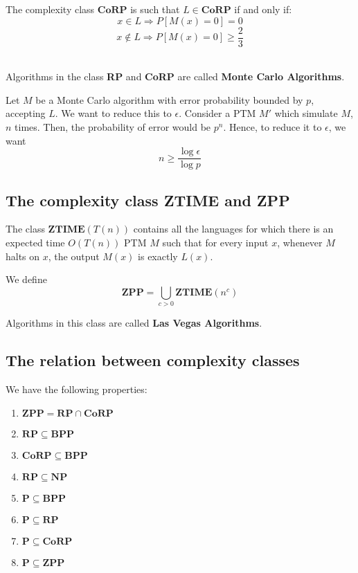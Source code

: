 \documentclass[12pt,letterpaper]{article}
\theoremstyle{definition}
\begin{document}
The complexity class $\mathbf{CoRP}$ is such that $L \in \mathbf{CoRP}$ if and only if:
\[x \in L \Rightarrow P[M(x) = 0] = 0\]
\[x \notin L \Rightarrow P[M(x) = 0] \geq \frac{2}{3}\]\

Algorithms in the class \textbf{RP} and \textbf{CoRP}   are called \textbf{Monte Carlo Algorithms}.

Let $M$ be a Monte Carlo algorithm with error probability bounded by $p$, accepting $L$. We want to reduce this to $\epsilon$. Consider a PTM $M'$  which simulate $M$, $n$  times. Then, the probability of error would be $p^n$. Hence, to reduce it to $\epsilon$, we want
\[n \geq \frac{\log \epsilon}{\log p}\]

\subsection{The complexity class ZTIME and ZPP}

The class $\mathbf{ZTIME}(T(n))$ contains all the languages for which there is an expected time $O(T(n))$ PTM $M$ such that for every input $x$, whenever $M$ halts on $x$, the output $M(x)$ is exactly $L(x)$.

We define 
\[\mathbf{ZPP} = \bigcup_{c > 0} \mathbf{ZTIME}(n^c)\]

Algorithms in this class are called \textbf{Las Vegas Algorithms}.

\subsection{The relation between complexity classes}

We have the following properties:

\begin{enumerate}
  \item $\mathbf{ZPP} = \mathbf{RP} \cap \mathbf{CoRP}$
  \item $\mathbf{RP} \subseteq \mathbf{BPP}$
  \item $\mathbf{CoRP} \subseteq \mathbf{BPP}$
  \item $\mathbf{RP} \subseteq \mathbf{NP}$
  \item $\mathbf{P} \subseteq \mathbf{BPP}$
  \item $\mathbf{P} \subseteq \mathbf{RP}$
  \item $\mathbf{P} \subseteq \mathbf{CoRP}$
  \item $\mathbf{P} \subseteq \mathbf{ZPP}$
  \end{enumerate}
\end{document}

